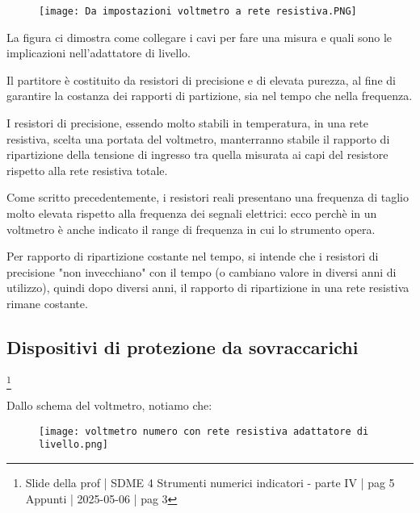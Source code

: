 \begin{figure}[h]
    \centering
    \texttt{[image: Da impostazioni voltmetro a rete resistiva.PNG]}
\end{figure}

La figura ci dimostra come collegare i cavi per fare una misura e quali sono le implicazioni nell'adattatore di livello. \newline 

Il partitore è costituito da resistori di precisione e di elevata purezza, 
al fine di garantire la costanza dei rapporti di partizione, sia nel tempo che nella frequenza. \newline 

I resistori di precisione, essendo molto stabili in temperatura, in una rete resistiva, scelta una portata del voltmetro, 
manterranno stabile il rapporto di ripartizione della tensione di ingresso tra quella misurata ai capi del resistore rispetto alla rete resistiva totale. \newline 

Come scritto precedentemente, i resistori reali presentano una frequenza di taglio molto elevata rispetto alla frequenza dei segnali elettrici: 
ecco perchè in un voltmetro è anche indicato il range di frequenza in cui lo strumento opera. \newline 

Per rapporto di ripartizione costante nel tempo, si intende che i resistori di precisione "non invecchiano" con il tempo (o cambiano valore in diversi anni di utilizzo), 
quindi dopo diversi anni, il rapporto di ripartizione in una rete resistiva rimane costante. \newline 



\newpage 

\subsection{Dispositivi di protezione da sovraccarichi}
\footnote{Slide della prof | SDME 4 Strumenti numerici indicatori - parte IV | pag 5 \\  
Appunti | 2025-05-06 | pag 3} 

Dallo schema del voltmetro, notiamo che:

\begin{figure}[h]
    \centering
    \texttt{[image: voltmetro numero con rete resistiva adattatore di livello.png]}
\end{figure}

